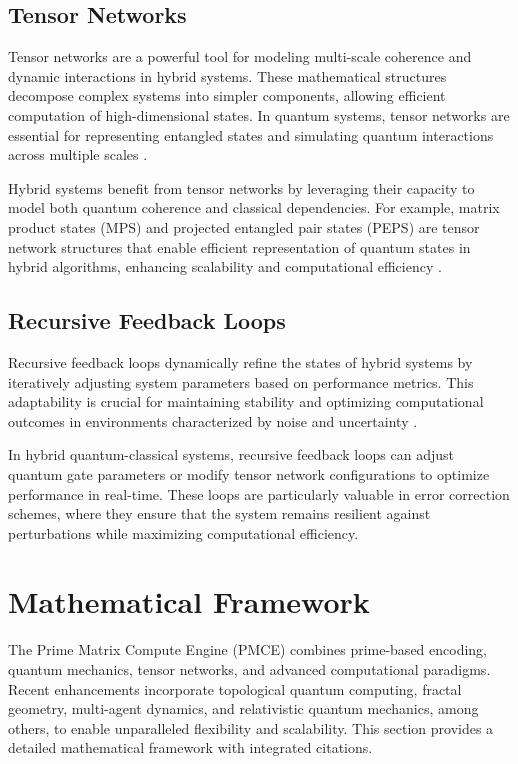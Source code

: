 \documentclass{article}
\theoremstyle{plain}
\begin{document}
\subsection{Tensor Networks}
Tensor networks are a powerful tool for modeling multi-scale coherence and dynamic interactions in hybrid systems. These mathematical structures decompose complex systems into simpler components, allowing efficient computation of high-dimensional states. In quantum systems, tensor networks are essential for representing entangled states and simulating quantum interactions across multiple scales \cite{orus2014practical}.

Hybrid systems benefit from tensor networks by leveraging their capacity to model both quantum coherence and classical dependencies. For example, matrix product states (MPS) and projected entangled pair states (PEPS) are tensor network structures that enable efficient representation of quantum states in hybrid algorithms, enhancing scalability and computational efficiency \cite{orus2019tensor}.

\subsection{Recursive Feedback Loops}
Recursive feedback loops dynamically refine the states of hybrid systems by iteratively adjusting system parameters based on performance metrics. This adaptability is crucial for maintaining stability and optimizing computational outcomes in environments characterized by noise and uncertainty \cite{zhang2021hybrid}.

In hybrid quantum-classical systems, recursive feedback loops can adjust quantum gate parameters or modify tensor network configurations to optimize performance in real-time. These loops are particularly valuable in error correction schemes, where they ensure that the system remains resilient against perturbations while maximizing computational efficiency.


\section{Mathematical Framework}

The Prime Matrix Compute Engine (PMCE) combines prime-based encoding, quantum mechanics, tensor networks, and advanced computational paradigms. Recent enhancements incorporate topological quantum computing, fractal geometry, multi-agent dynamics, and relativistic quantum mechanics, among others, to enable unparalleled flexibility and scalability. This section provides a detailed mathematical framework with integrated citations.
\end{document}
